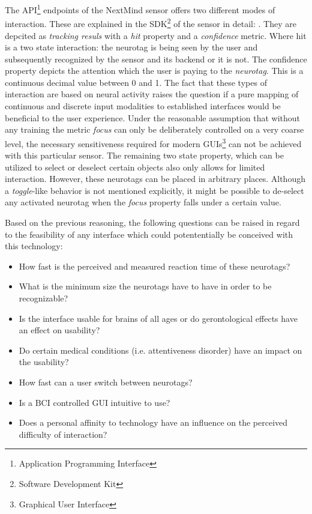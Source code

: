             The API\footnote{Application Programming Interface} endpoints of the NextMind sensor offers two different modes of interaction. These are explained in the SDK\footnote{Software Development Kit} of the sensor in detail: \cite{NextMind.18112020}.
            They are depcited as \textit{tracking resuls} with a \textit{hit} property and a \textit{confidence} metric. Where hit is a two state interaction: the neurotag is being seen by the user and subsequently recognized by the sensor and its backend or it is not. The confidence property depicts the attention which the user is paying to the \textit{neurotag}. This is a continuous decimal value between 0 and 1.
            The fact that these types of interaction are based on neural activity raises the question if a pure mapping of continuous and discrete input modalities to established interfaces would be beneficial to the user experience. Under the reasonable assumption that without any training the metric \textit{focus} can only be deliberately controlled on a very coarse level, the necessary sensitiveness required for modern GUIs\footnote{Graphical User Interface} can not be achieved with this particular sensor. The remaining two state property, which can be utilized to select or deselect certain objects also only allows for limited interaction. However, these neurotags can be placed in arbitrary places. Although a \textit{toggle}-like behavior is not mentioned explicitly, it might be possible to de-select any activated neurotag when the \textit{focus} property falls under a certain value.

            \bigskip

            Based on the previous reasoning, the following questions can be raised in regard to the feasibility of any interface which could potententially be conceived with this technology:

            \begin{itemize}
                \item How fast is the perceived and measured reaction time of these neurotags?
                \item What is the minimum size the neurotags have to have in order to be recognizable?
                \item Is the interface usable for brains of all ages or do gerontological effects have an effect on usability?
                \item Do certain medical conditions (i.e. attentiveness disorder) have an impact on the usability?
                \item How fast can a user switch between neurotags?
                \item Is a BCI controlled GUI intuitive to use?
                \item Does a personal affinity to technology have an influence on the perceived difficulty of interaction?
            \end{itemize}

